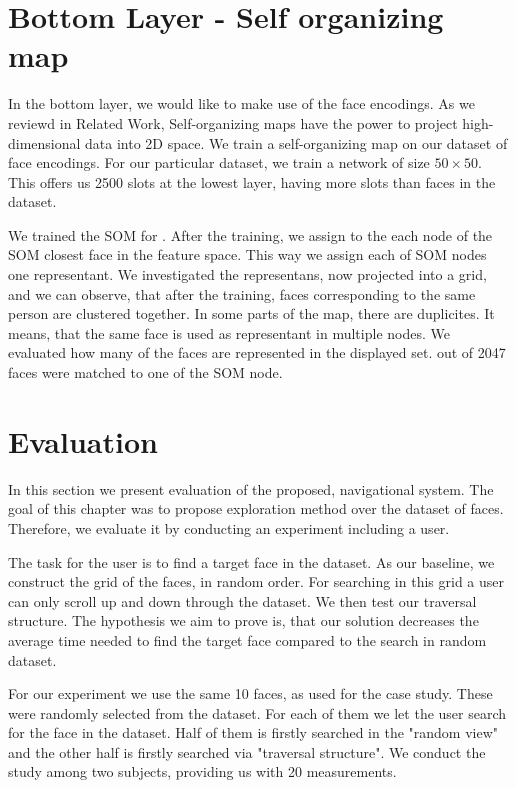 \section{Bottom Layer - Self organizing map}

In the bottom layer, we would like to make use of the face encodings. As we reviewd in Related Work, Self-organizing maps have the power to project high-dimensional data into 2D space. We train a self-organizing map on our dataset of face encodings. For our particular dataset, we train a network of size $50\times 50$. This offers us 2500 slots at the lowest layer, having more slots than faces in the dataset.

We trained the SOM for \todo{}. After the training, we assign to the each node of the SOM closest face in the feature space. This way we assign each of SOM nodes one representant. We investigated the representans, now projected into a grid, and we can observe, that after the training, faces corresponding to the same person are clustered together. In some parts of the map, there are duplicites. It means, that the same face is used as representant in multiple nodes. We evaluated how many of the faces are represented in the displayed set. \todo{} out of 2047 faces were matched to one of the SOM node.

\section{Evaluation}

In this section we present evaluation of the proposed, navigational system. The goal of this chapter was to propose exploration method over the dataset of faces. Therefore, we evaluate it by conducting an experiment including a user.

The task for the user is to find a target face in the dataset. As our baseline, we construct the grid of the faces, in random order. For searching in this grid a user can only scroll up and down through the dataset. We then test our traversal structure. The hypothesis we aim to prove is, that our solution decreases the average time needed to find the target face compared to the search in random dataset.

For our experiment we use the same 10 faces, as used for the case study. These were randomly selected from the dataset. For each of them we let the user search for the face in the dataset. Half of them is firstly searched in the "random view" and the other half is firstly searched via "traversal structure". We conduct the study among two subjects, providing us with 20 measurements.


